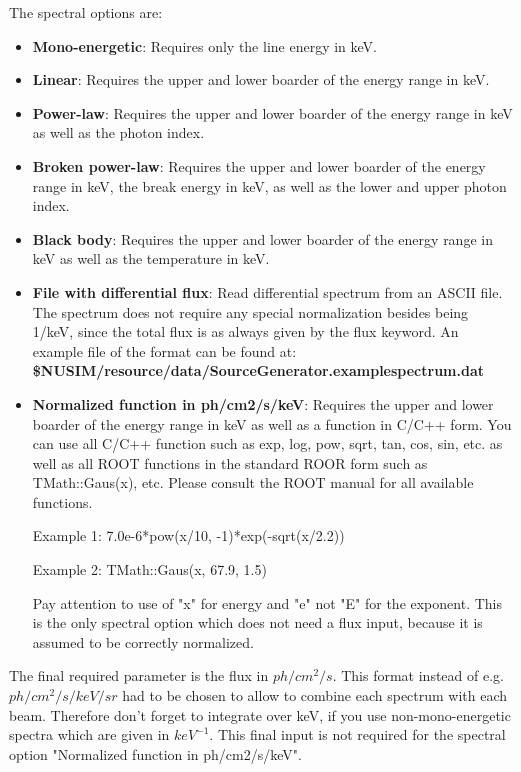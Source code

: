 The spectral options are:
\begin{itemize} 
\item \textbf{Mono-energetic}: Requires only the line energy in keV.
\item \textbf{Linear}: Requires the upper and lower boarder of the energy range in keV.
\item \textbf{Power-law}: Requires the upper and lower boarder of the energy range in keV as well as the photon index.
\item \textbf{Broken power-law}: Requires the upper and lower boarder of the energy range in keV, the break energy in keV, as well as the lower and upper photon index.
\item \textbf{Black body}: Requires the upper and lower boarder of the energy range in keV as well as the temperature in keV.
\item \textbf{File with differential flux}: Read differential spectrum from an ASCII file. The spectrum does not require any special normalization besides being 1/keV, since the total flux is as always given by the flux keyword. An example file of the format can be found at:\\
\textbf{\${NUSIM}/resource/data/SourceGenerator.examplespectrum.dat}
\item \textbf{Normalized function in ph/cm2/s/keV}: Requires the upper and lower boarder of the energy range in keV as well as a function in C/C++ form.  You can use all C/C++ function such as exp, log, pow, sqrt, tan, cos, sin, etc. as well as all ROOT functions in the standard ROOR form such as TMath::Gaus(x), etc. Please consult the ROOT manual for all available functions.

Example 1: 7.0e-6*pow(x/10, -1)*exp(-sqrt(x/2.2))

Example 2: TMath::Gaus(x, 67.9, 1.5)

Pay attention to use of "x" for energy and "e" not "E" for the exponent. This is the only spectral option which does not need a flux input, because it is assumed to be correctly normalized.
\end{itemize}

The final required parameter is the flux in $ph/cm^2/s$. This format instead of e.g. $ph/cm^2/s/keV/sr$ had to be chosen to allow to combine each spectrum with each beam. Therefore don't forget to integrate over keV, if you use non-mono-energetic spectra which are given in $keV^{-1}$. This final input is not required for the spectral option "Normalized function in ph/cm2/s/keV".


